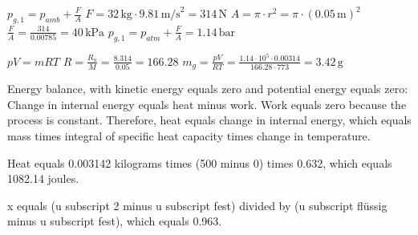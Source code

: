 \( p_{g,1} = p_{amb} + \frac{F}{A} \)  
\( F = 32 \, \text{kg} \cdot 9.81 \, \text{m/s}^2 = 314 \, \text{N} \)  
\( A = \pi \cdot r^2 = \pi \cdot (0.05 \, \text{m})^2 \)  
\( \frac{F}{A} = \frac{314}{0.00785} = 40 \, \text{kPa} \)  
\( p_{g,1} = p_{atm} + \frac{F}{A} = 1.14 \, \text{bar} \)  

\( pV = mRT \)  
\( R = \frac{R_u}{M} = \frac{8.314}{0.05} = 166.28 \)  
\( m_g = \frac{pV}{RT} = \frac{1.14 \cdot 10^5 \cdot 0.00314}{166.28 \cdot 773} = 3.42 \, \text{g} \)

Energy balance, with kinetic energy equals zero and potential energy equals zero:  
Change in internal energy equals heat minus work. Work equals zero because the process is constant.  
Therefore, heat equals change in internal energy, which equals mass times integral of specific heat capacity times change in temperature.  

Heat equals 0.003142 kilograms times (500 minus 0) times 0.632, which equals 1082.14 joules.

x equals (u subscript 2 minus u subscript fest) divided by (u subscript flüssig minus u subscript fest), which equals 0.963.